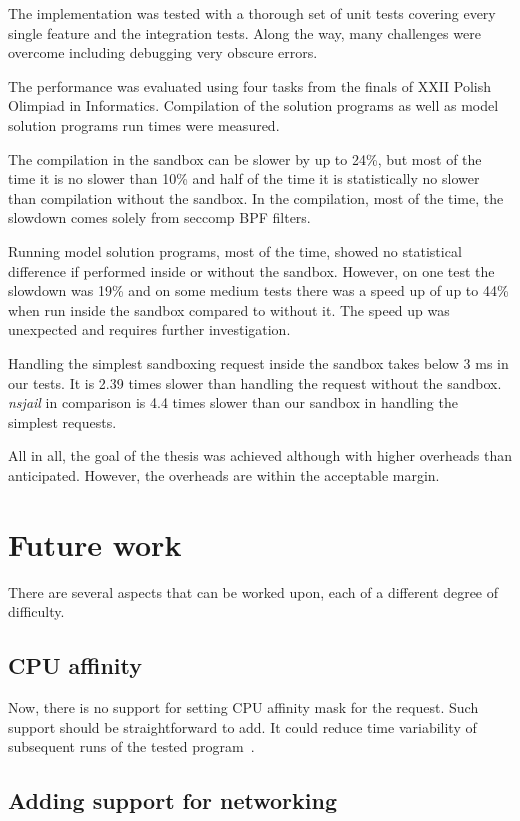 \documentclass[en]{pracamgr}
\begin{document}
The implementation was tested with a thorough set of unit tests covering every single feature and the integration tests. Along the way, many challenges were overcome including debugging very obscure errors.

The performance was evaluated using four tasks from the finals of XXII Polish Olimpiad in Informatics. Compilation of the solution programs as well as model solution programs run times were measured.

The compilation in the sandbox can be slower by up to 24\%, but most of the time it is no slower than 10\% and half of the time it is statistically no slower than
compilation without the sandbox. In the compilation, most of the time, the slowdown comes solely from seccomp BPF filters.

Running model solution programs, most of the time, showed no statistical difference if performed inside or without the sandbox. However, on one test the slowdown was 19\% and on some medium tests there was a speed up of up to 44\% when run inside the sandbox compared to without it. The speed up was unexpected and requires further investigation.

Handling the simplest sandboxing request inside the sandbox takes below 3 ms in our tests. It is 2.39 times slower than handling the request without the sandbox. \textit{nsjail} in comparison is 4.4 times slower than our sandbox in handling the simplest requests.

All in all, the goal of the thesis was achieved although with higher overheads than anticipated. However, the overheads are within the acceptable margin.

\section{Future work}\label{chapter:future_work}

There are several aspects that can be worked upon, each of a different degree of difficulty.

\subsection{CPU affinity}

Now, there is no support for setting CPU affinity mask for the request. Such support should be straightforward to add. It could reduce time variability of subsequent runs of the tested program~\cite{merry2010performance}.

\subsection{Adding support for networking}
\end{document}
